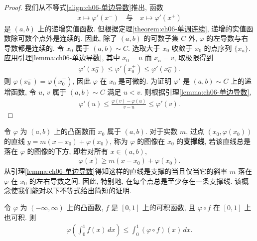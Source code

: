 \documentclass[../../main.tex]{subfiles}
\begin{document}
\begin{proof}
我们从不等式\eqref{align:ch06-单边导数}推出, 函数
\begin{align*}
x\mapsto\varphi'(x^{-})\quad\text{与}\quad x\mapsto\varphi'(x^{+})
\end{align*}
是 $(a,b)$ 上的递增实值函数. 但根据定理\cref{theorem:ch06-单调连续}, 递增的实值函数除可数个点外是连续的. 因此, 除了 $(a,b)$ 的可数子集 $C$ 外, $\varphi$ 的左导数与右导数都是连续的. 令 $x_{0}$ 属于 $(a,b)\sim C$. 选取大于 $x_{0}$ 收敛于 $x_{0}$ 的点序列 $\{x_{n}\}$. 应用引理\cref{lemma:ch06-单边导数}, 其中 $x_{0}=u$ 而 $x_{n}=v$, 取极限得到
\begin{align*}
\varphi'(x_{0}^{-})\leqslant\varphi'(x_{0}^{+})\leqslant\varphi'(x_{0}^{-}).
\end{align*}
则 $\varphi(x_{0}^{-})=\varphi(x_{0}^{+})$, 因此 $\varphi$ 在 $x_{0}$ 是可微的. 为证明 $\varphi'$ 是 $(a,b)\sim C$ 上的递增函数, 令 $u$, $v$ 属于 $(a,b)\sim C$ 满足 $u<v$. 则根据引理\cref{lemma:ch06-单边导数},
\begin{align*}
\varphi'(u)\leqslant\frac{\varphi(v)-\varphi(u)}{v-u}\leqslant\varphi'(v).
\end{align*}
\end{proof}

令 $\varphi$ 为 $(a,b)$ 上的凸函数而 $x_{0}$ 属于 $(a,b)$. 对于实数 $m$, 过点 $(x_{0},\varphi(x_{0}))$ 的直线 $y=m(x-x_{0})+\varphi(x_{0})$, 称为 $\varphi$ 的图像在 $x_{0}$ 的\textbf{支撑线}, 若该直线总是落在 $\varphi$ 的图像的下方, 即若对所有 $x\in(a,b)$,
\begin{align*}
\varphi(x)\geqslant m(x-x_{0})+\varphi(x_{0}).
\end{align*}
从引理\cref{lemma:ch06-单边导数}得知这样的直线是支撑的当且仅当它的斜率 $m$ 落在 $\varphi$ 在 $x_{0}$ 的左右导数之间. 因此, 特别地, 在每个点总是至少存在一条支撑线. 该概念使我们能对以下不等式给出简短的证明.

\begin{theorem}\label{theorem:ch06-Jensen}
令 $\varphi$ 为 $(-\infty,\infty)$ 上的凸函数, $f$ 是 $[0,1]$ 上的可积函数, 且 $\varphi\circ f$ 在 $[0,1]$ 上也可积. 则
\begin{align}
\varphi\left(\int_{0}^{1}f(x)\,dx\right)\leqslant\int_{0}^{1}(\varphi\circ f)(x)\,dx.\label{align:ch06-Jensen}
\end{align}
\end{theorem}
\end{document}
